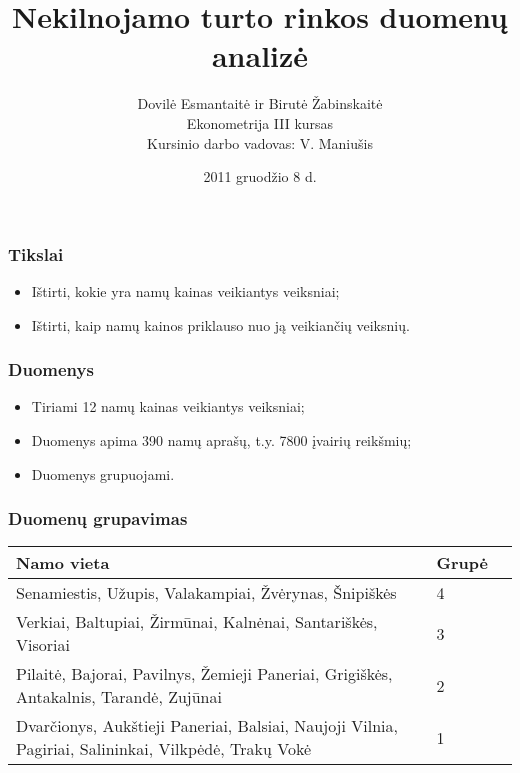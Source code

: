 \documentclass[utf8,hyperref={unicode}]{beamer}
\title{Nekilnojamo turto rinkos duomenų analizė}
\author[Dovilė Esmantaitė, Birutė Žabinskaitė]{Dovilė Esmantaitė ir Birutė Žabinskaitė\\ Ekonometrija III kursas\\ Kursinio darbo vadovas: V. Maniušis}
\institute[Vilnius University] {
    
    Vilniaus Universitetas
    \and
    
    Matematikos ir informatikos fakultetas
 }
\date{2011 gruodžio 8 d.}
\theoremstyle{change}\newtheorem{teorema}{Teiginys}
\theoremstyle{change}\newtheorem{salyga}{}
\begin{document}
\begin{frame}
    \titlepage
\end{frame}

\begin{frame}
    \frametitle{Tikslai} 
    \begin{itemize}
	\item\Large{ Ištirti, kokie yra namų kainas veikiantys veiksniai;}
            \vskip 20pt
            \item Ištirti, kaip namų kainos priklauso nuo ją veikiančių veiksnių.
    \end{itemize}
\end{frame}

\begin{frame}
    \frametitle{Duomenys} 
    \begin{itemize}
	\item\Large Tiriami 12 namų kainas veikiantys veiksniai;
	\item Duomenys apima 390 namų aprašų, t.y. 7800 įvairių reikšmių;
	 \item Duomenys grupuojami.
    \end{itemize}
\end{frame}

\begin{frame}\large
    \frametitle{Duomenų grupavimas } 
     \begin{table}[H]
        \begin{center}
        \begin{tabular}{ | p{8cm} | l | l |}
       \hline
       \textbf{Namo vieta} & \textbf{Grupė} \\ \hline
    Senamiestis, Užupis, Valakampiai, Žvėrynas, Šnipiškės & 4 \\ \hline
    Verkiai, Baltupiai, Žirmūnai, Kalnėnai, Santariškės, Visoriai & 3 \\ \hline
    Pilaitė, Bajorai, Pavilnys, Žemieji Paneriai, Grigiškės, Antakalnis, Tarandė, Zujūnai & 2 \\ \hline
    Dvarčionys, Aukštieji Paneriai, Balsiai, Naujoji Vilnia, Pagiriai, Salininkai, Vilkpėdė, Trakų Vokė & 1 \\ \hline
    \end{tabular}
\end{center}
\end{table}
\end{frame}
\end{document}
